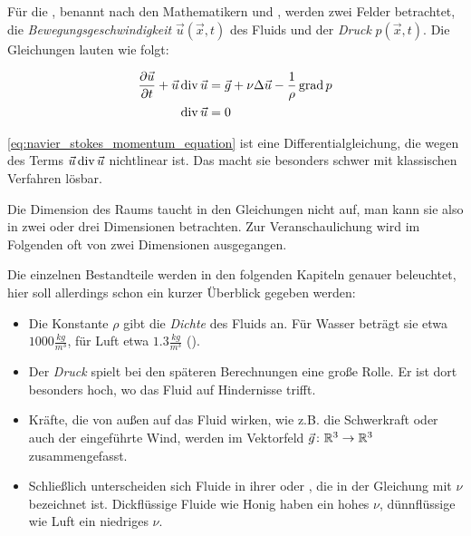 Für die , benannt nach den
Mathematikern  und , werden zwei Felder betrachtet, die \emph{Bewegungsgeschwindigkeit}
$\vec{u}(\vec{x},t)$ des Fluids und der \emph{Druck} $p(\vec{x},t)$. Die
Gleichungen lauten wie folgt:

\begin{align}
\label{eq:navier_stokes_momentum_equation}
\frac{
	\partial
	\vec{u}
}
{
	\partial t
} +
\vec{u} \operatorname*{div} \vec{u}
& =
\vec{g} +
\nu \Delta \vec{u} -
\frac{
	1
}
{
	\rho
}
\operatorname*{grad} p
\\
\label{eq:navier_stokes_incompressibility_condition}
\operatorname*{div} \vec{u} & = 0
\end{align}

\autoref{eq:navier_stokes_momentum_equation} ist eine Differentialgleichung, die
wegen des Terms $\vec{u} \operatorname*{div} \vec{u}$ nichtlinear ist. Das macht sie
besonders schwer mit klassischen Verfahren lösbar.

Die Dimension des Raums taucht in den Gleichungen nicht auf, man kann sie also
in zwei oder drei Dimensionen betrachten. Zur Veranschaulichung wird im
Folgenden oft von zwei Dimensionen ausgegangen.

Die einzelnen Bestandteile werden in den folgenden Kapiteln genauer beleuchtet,
hier soll allerdings schon ein kurzer Überblick gegeben werden:

\begin{itemize}
\item
	Die Konstante $\rho$ gibt die \emph{Dichte} des Fluids an. Für Wasser beträgt
	sie etwa $1000 \frac{kg}{m^3}$, für Luft etwa $1.3 \frac{kg}{m^3}$
	(\cite{Bridson2007}).
\item
	Der \emph{Druck} spielt bei den späteren Berechnungen eine große Rolle.
	Er ist dort besonders hoch, wo das Fluid auf Hindernisse trifft.
\item
	Kräfte, die von außen auf das Fluid wirken, wie z.B. die Schwerkraft
	oder auch der eingeführte Wind, werden im Vektorfeld $\vec{g} \colon
	\mathbb{R}^3 \to \mathbb{R}^3$ zusammengefasst.
\item
	Schließlich unterscheiden sich Fluide in ihrer  oder
	, die in der Gleichung mit $\nu$ bezeichnet ist.
	Dickflüssige Fluide wie Honig haben ein hohes $\nu$, dünnflüssige wie Luft ein
	niedriges $\nu$.
\end{itemize}

